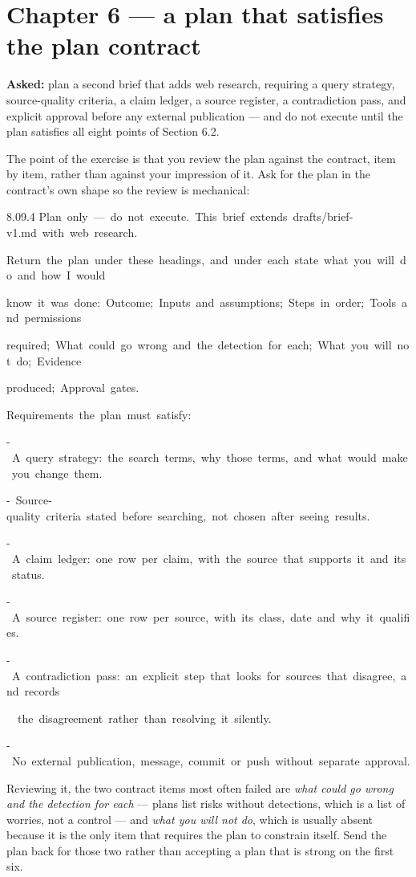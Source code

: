 \documentclass[11pt,a4paper,twoside,openany]{book}
\newcommand{\cl}[1]{\noindent\mbox{#1}\par}
\begin{document}
\FloatBarrier
\section*{Chapter 6 — a plan that satisfies the plan contract}

\textbf{Asked:} plan a second brief that adds web research, requiring a query strategy, source-quality criteria, a claim ledger, a source register, a contradiction pass, and explicit approval before any external publication — and do not execute until the plan satisfies all eight points of Section 6.2.


The point of the exercise is that you review the plan against the contract, item by item, rather than against your impression of it. Ask for the plan in the contract's own shape so the review is mechanical:


\begin{codeblock}{8.0}{9.4}
\cl{Plan~only~—~do~not~execute.~This~brief~extends~drafts/brief-v1.md~with~web~research.}
\cl{}
\cl{Return~the~plan~under~these~headings,~and~under~each~state~what~you~will~do~and~how~I~would}
\cl{know~it~was~done:~Outcome;~Inputs~and~assumptions;~Steps~in~order;~Tools~and~permissions}
\cl{required;~What~could~go~wrong~and~the~detection~for~each;~What~you~will~not~do;~Evidence}
\cl{produced;~Approval~gates.}
\cl{}
\cl{Requirements~the~plan~must~satisfy:}
\cl{-~A~query~strategy:~the~search~terms,~why~those~terms,~and~what~would~make~you~change~them.}
\cl{-~Source-quality~criteria~stated~before~searching,~not~chosen~after~seeing~results.}
\cl{-~A~claim~ledger:~one~row~per~claim,~with~the~source~that~supports~it~and~its~status.}
\cl{-~A~source~register:~one~row~per~source,~with~its~class,~date~and~why~it~qualifies.}
\cl{-~A~contradiction~pass:~an~explicit~step~that~looks~for~sources~that~disagree,~and~records}
\cl{~~the~disagreement~rather~than~resolving~it~silently.}
\cl{-~No~external~publication,~message,~commit~or~push~without~separate~approval.}
\end{codeblock}

Reviewing it, the two contract items most often failed are \emph{what could go wrong and the detection for each} — plans list risks without detections, which is a list of worries, not a control — and \emph{what you will not do}, which is usually absent because it is the only item that requires the plan to constrain itself. Send the plan back for those two rather than accepting a plan that is strong on the first six.
\end{document}
